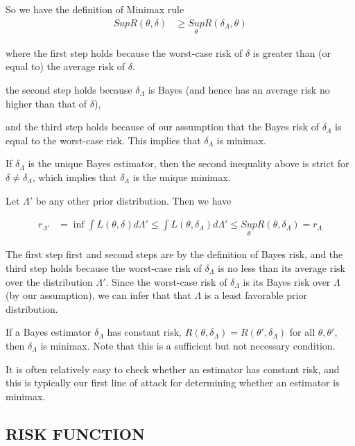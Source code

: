 So we have the definition of Minimax rule
\begin{align*}
Sup R(\theta, \delta) & \geq  \underset{\theta}{Sup} R(\delta_{\Lambda}, \theta)
\end{align*}

where the first step holds because the worst-case risk of $\delta$ is greater than (or equal to) the average risk of $\delta$. 

the second step holds because $\delta_{\Lambda}$ is Bayes (and hence has an average risk no higher than that of $\delta$), 

and the third step holds because of our assumption that the Bayes risk of $\delta_{\Lambda}$ is equal to the worst-case risk. This implies that $\delta_{\Lambda}$ is minimax.

If $\delta_{\Lambda}$ is the unique Bayes estimator, then the second inequality above is strict for $\delta \neq \delta_{\Lambda}$, which implies that $\delta_{\Lambda}$ is the unique minimax.

Let $\Lambda'$ be any other prior distribution. Then we have 

\begin{align*}
r_{\Lambda'} &= \inf \int L(\theta, \delta) d \Lambda' \leq \int L(\theta, \delta_{\Lambda}) d \Lambda' \leq \underset{\theta}{Sup} R(\theta, \delta_{\Lambda}) = r_{\Lambda}
\end{align*}

The first step first and second steps are by the definition of Bayes risk, and the third step holds because the worst-case risk of $\delta_{\Lambda}$ is no less than its average risk over the distribution $\Lambda'$. Since the worst-case risk of $\delta_{\Lambda}$ is its Bayes risk over $\Lambda$ (by our assumption), we can infer that that $\Lambda$  is a least favorable prior distribution.

\begin{Corollary}
If a Bayes estimator $\delta_{\Lambda}$ has constant risk, $R(\theta, \delta_{\Lambda}) = R(\theta', \delta_{\Lambda}) $ for all $\theta, \theta'$, then $\delta_{\Lambda}$ is minimax. Note that this is a sufficient but not necessary condition.
\end{Corollary}

It is often relatively easy to check whether an estimator has constant risk, and this is typically our first line of attack for determining whether an estimator is minimax.

\subsection{RISK FUNCTION}


